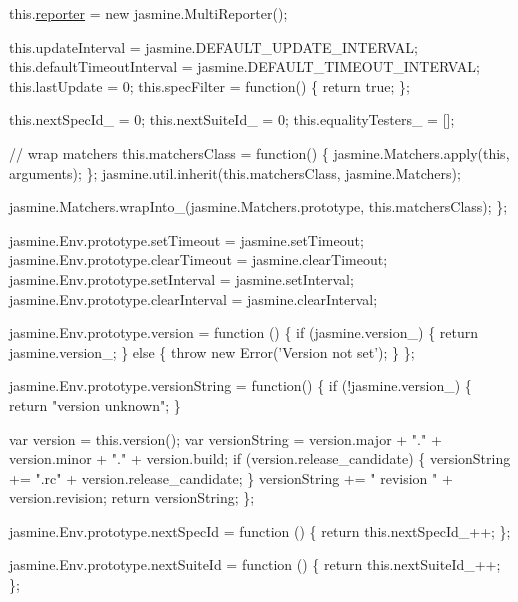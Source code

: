 \begin{DoxyCodeInclude}
  this.\hyperlink{classreporter}{reporter} = \textcolor{keyword}{new} jasmine.MultiReporter();

  this.updateInterval = jasmine.DEFAULT\_UPDATE\_INTERVAL;
  this.defaultTimeoutInterval = jasmine.DEFAULT\_TIMEOUT\_INTERVAL;
  this.lastUpdate = 0;
  this.specFilter = \textcolor{keyword}{function}() \{
    \textcolor{keywordflow}{return} \textcolor{keyword}{true};
  \};

  this.nextSpecId\_ = 0;
  this.nextSuiteId\_ = 0;
  this.equalityTesters\_ = [];

  \textcolor{comment}{// wrap matchers}
  this.matchersClass = \textcolor{keyword}{function}() \{
    jasmine.Matchers.apply(\textcolor{keyword}{this}, arguments);
  \};
  jasmine.util.inherit(this.matchersClass, jasmine.Matchers);

  jasmine.Matchers.wrapInto\_(jasmine.Matchers.prototype, \textcolor{keyword}{this}.matchersClass);
\};


jasmine.Env.prototype.setTimeout = jasmine.setTimeout;
jasmine.Env.prototype.clearTimeout = jasmine.clearTimeout;
jasmine.Env.prototype.setInterval = jasmine.setInterval;
jasmine.Env.prototype.clearInterval = jasmine.clearInterval;

jasmine.Env.prototype.version = \textcolor{keyword}{function} () \{
  \textcolor{keywordflow}{if} (jasmine.version\_) \{
    \textcolor{keywordflow}{return} jasmine.version\_;
  \} \textcolor{keywordflow}{else} \{
    \textcolor{keywordflow}{throw} \textcolor{keyword}{new} Error(\textcolor{stringliteral}{'Version not set'});
  \}
\};

jasmine.Env.prototype.versionString = \textcolor{keyword}{function}() \{
  \textcolor{keywordflow}{if} (!jasmine.version\_) \{
    \textcolor{keywordflow}{return} \textcolor{stringliteral}{"version unknown"};
  \}

  var version = this.version();
  var versionString = version.major + \textcolor{stringliteral}{"."} + version.minor + \textcolor{stringliteral}{"."} + version.build;
  \textcolor{keywordflow}{if} (version.release\_candidate) \{
    versionString += \textcolor{stringliteral}{".rc"} + version.release\_candidate;
  \}
  versionString += \textcolor{stringliteral}{" revision "} + version.revision;
  \textcolor{keywordflow}{return} versionString;
\};

jasmine.Env.prototype.nextSpecId = \textcolor{keyword}{function} () \{
  \textcolor{keywordflow}{return} this.nextSpecId\_++;
\};

jasmine.Env.prototype.nextSuiteId = \textcolor{keyword}{function} () \{
  \textcolor{keywordflow}{return} this.nextSuiteId\_++;
\};


\end{DoxyCodeInclude}

